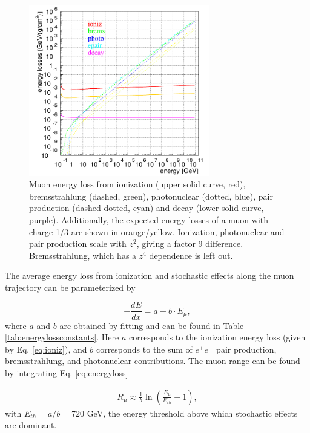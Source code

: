 \begin{figure}[t]
\centering
\includegraphics[width = 0.7\textwidth]{chapter4/img/muonenergyloss_extra.png}
\caption{Muon energy loss from ionization (upper solid curve, red), bremsstrahlung (dashed, green), photonuclear (dotted, blue), pair production (dashed-dotted, cyan) and decay (lower solid curve, purple). Additionally, the expected energy losses of a muon with charge 1/3 are shown in orange/yellow. Ionization, photonuclear and pair production scale with $z^2$, giving a factor 9 difference. Bremsstrahlung, which has a $z^4$ dependence is left out.}
\label{fig:energyloss}
\end{figure}

\noindent The average energy loss from ionization and stochastic effects along the muon trajectory can be parameterized by \cite{Barrett:1952woo} 

\begin{equation}
\label{eq:energyloss}
- \frac{dE}{dx} = a + b \cdot E_\mu,
\end{equation}
where $a$ and $b$ are obtained by fitting and can be found in Table \ref{tab:energylossconstants}. Here $a$ corresponds to the ionization energy loss (given by Eq. \ref{eq:ioniz}), and $b$ corresponds to the sum of $e^+e^-$ pair production, bremsstrahlung, and photonuclear contributions. The muon range can be found by integrating Eq. \ref{eq:energyloss}

\begin{equation}
\begin{split}
R_\mu \approx \frac{1}{b} \ln \left( \frac{E_\mu}{E_{th}} +1 \right),
\end{split}
\end{equation}
with $E_{th} = a/b = 720$ GeV, the energy threshold above which stochastic effects are dominant.\\


